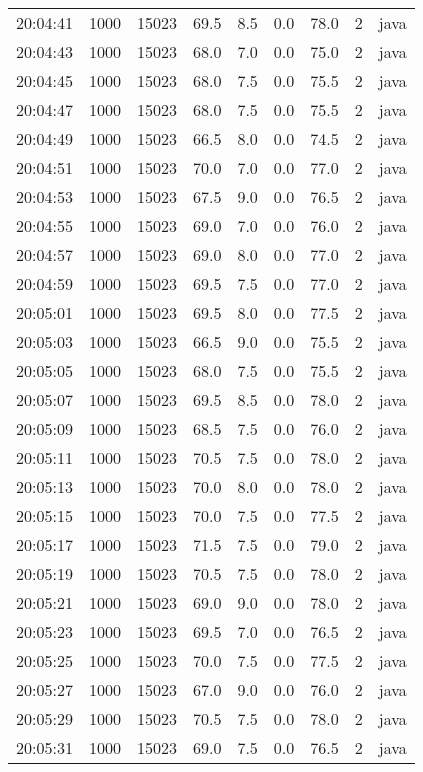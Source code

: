 \documentclass[11pt]{article}
\begin{document}
\begin{table}[htbp]
\begin{tabular}{rrrrrrrrl}
20:04:41 & 1000 & 15023 & 69.5 & 8.5 & 0.0 & 78.0 & 2 & java\\
20:04:43 & 1000 & 15023 & 68.0 & 7.0 & 0.0 & 75.0 & 2 & java\\
20:04:45 & 1000 & 15023 & 68.0 & 7.5 & 0.0 & 75.5 & 2 & java\\
20:04:47 & 1000 & 15023 & 68.0 & 7.5 & 0.0 & 75.5 & 2 & java\\
20:04:49 & 1000 & 15023 & 66.5 & 8.0 & 0.0 & 74.5 & 2 & java\\
20:04:51 & 1000 & 15023 & 70.0 & 7.0 & 0.0 & 77.0 & 2 & java\\
20:04:53 & 1000 & 15023 & 67.5 & 9.0 & 0.0 & 76.5 & 2 & java\\
20:04:55 & 1000 & 15023 & 69.0 & 7.0 & 0.0 & 76.0 & 2 & java\\
20:04:57 & 1000 & 15023 & 69.0 & 8.0 & 0.0 & 77.0 & 2 & java\\
20:04:59 & 1000 & 15023 & 69.5 & 7.5 & 0.0 & 77.0 & 2 & java\\
20:05:01 & 1000 & 15023 & 69.5 & 8.0 & 0.0 & 77.5 & 2 & java\\
20:05:03 & 1000 & 15023 & 66.5 & 9.0 & 0.0 & 75.5 & 2 & java\\
20:05:05 & 1000 & 15023 & 68.0 & 7.5 & 0.0 & 75.5 & 2 & java\\
20:05:07 & 1000 & 15023 & 69.5 & 8.5 & 0.0 & 78.0 & 2 & java\\
20:05:09 & 1000 & 15023 & 68.5 & 7.5 & 0.0 & 76.0 & 2 & java\\
20:05:11 & 1000 & 15023 & 70.5 & 7.5 & 0.0 & 78.0 & 2 & java\\
20:05:13 & 1000 & 15023 & 70.0 & 8.0 & 0.0 & 78.0 & 2 & java\\
20:05:15 & 1000 & 15023 & 70.0 & 7.5 & 0.0 & 77.5 & 2 & java\\
20:05:17 & 1000 & 15023 & 71.5 & 7.5 & 0.0 & 79.0 & 2 & java\\
20:05:19 & 1000 & 15023 & 70.5 & 7.5 & 0.0 & 78.0 & 2 & java\\
20:05:21 & 1000 & 15023 & 69.0 & 9.0 & 0.0 & 78.0 & 2 & java\\
20:05:23 & 1000 & 15023 & 69.5 & 7.0 & 0.0 & 76.5 & 2 & java\\
20:05:25 & 1000 & 15023 & 70.0 & 7.5 & 0.0 & 77.5 & 2 & java\\
20:05:27 & 1000 & 15023 & 67.0 & 9.0 & 0.0 & 76.0 & 2 & java\\
20:05:29 & 1000 & 15023 & 70.5 & 7.5 & 0.0 & 78.0 & 2 & java\\
20:05:31 & 1000 & 15023 & 69.0 & 7.5 & 0.0 & 76.5 & 2 & java\\

\end{tabular}
\end{table}
\end{document}
